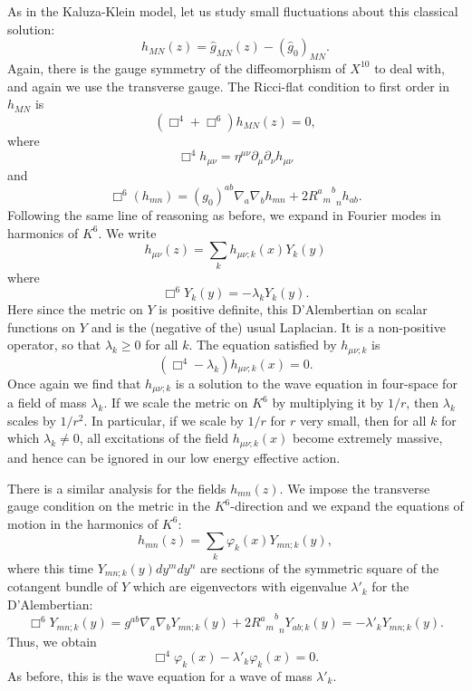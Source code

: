 As in the Kaluza-Klein model, let us study small fluctuations about
this classical solution:
$$h_{MN}(z)=\widehat{g}_{MN}(z)-(\widehat{g}_0)_{MN}.$$
Again, there is the gauge symmetry of the diffeomorphism of $X^{10}$
to deal with, and again we use the transverse
gauge.  The Ricci-flat condition to first order in $h_{MN}$ is
$$\left(\Box^4+\Box^6\right)h_{MN}(z)=0,$$
where
$$\Box^4h_{\mu\nu}=\eta^{\mu\nu}\partial_\mu\partial_\nu h_{\mu\nu}$$
and
$$\Box^6(h_{mn}) =
(g_0)^{ab}\nabla_a\nabla_bh_{mn}+2{{{R^a}_m}^b}_nh_{ab} .$$
Following the same line of reasoning as before, we expand in Fourier
modes in harmonics of $K^6$.
We write
$$h_{\mu\nu}(z)=\sum_kh_{\mu\nu;k}(x)Y_k(y)$$
where
$$\Box^6Y_k(y)=-\lambda_kY_k(y).$$
Here since the metric on $Y$ is positive definite, this D'Alembertian
on scalar functions on $Y$ and is the (negative of the) usual 
Laplacian. It is a non-positive operator, so that $\lambda_k\ge 0$ for
all $k$.
The equation satisfied by $h_{\mu\nu;k}$ is
$$(\Box^4-\lambda_k)h_{\mu\nu;k}(x)=0.$$
Once again we find that $h_{\mu\nu;k}$ is a solution to the wave
equation in four-space for a field of mass $\lambda_k$. If we scale
the metric on $K^6$ by multiplying it by $1/r$, then $\lambda_k$
scales by $1/r^2$. In particular, if we scale by $1/r$ for $r$ very
small, then for all $k$ for which $\lambda_k\not=0$, all
excitations of the field $h_{\mu\nu;k}(x)$ become extremely massive,
and hence can be ignored in our low energy effective action.

There is a similar analysis for the fields $h_{mn}(z)$.  We impose
the transverse gauge condition on the metric in the $K^6$-direction
and we expand the equations of motion in
the harmonics of $K^6$:
$$h_{mn}(z)=\sum_k\varphi_k(x)Y_{mn;k}(y),$$
where this time $Y_{mn;k}(y)dy^m dy^n$ are sections of the
symmetric square of the cotangent bundle of $Y$ which are eigenvectors with
eigenvalue $\lambda'_k$ for the D'Alembertian:
$$\Box^6Y_{mn;k}(y)=g^{ab}\nabla_a\nabla_bY_{mn;k}(y)
+2{{{R^a}_m}^b}_nY_{ab;k}(y)=-\lambda'_kY_{mn;k}(y).$$
Thus, we obtain
$$\Box^4\varphi_k(x)-\lambda'_k\varphi_k(x)=0.$$
As before, this is  the wave equation for a wave of mass $\lambda'_k$. 
 

